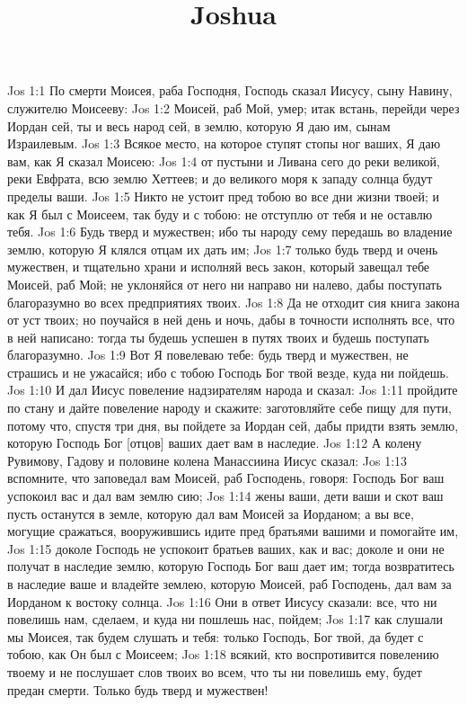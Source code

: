 

\title{Joshua}

Jos 1:1  По смерти Моисея, раба Господня, Господь сказал Иисусу, сыну Навину, служителю Моисееву:
Jos 1:2  Моисей, раб Мой, умер; итак встань, перейди через Иордан сей, ты и весь народ сей, в землю, которую Я даю им, сынам Израилевым.
Jos 1:3  Всякое место, на которое ступят стопы ног ваших, Я даю вам, как Я сказал Моисею:
Jos 1:4  от пустыни и Ливана сего до реки великой, реки Евфрата, всю землю Хеттеев; и до великого моря к западу солнца будут пределы ваши.
Jos 1:5  Никто не устоит пред тобою во все дни жизни твоей; и как Я был с Моисеем, так буду и с тобою: не отступлю от тебя и не оставлю тебя.
Jos 1:6  Будь тверд и мужествен; ибо ты народу сему передашь во владение землю, которую Я клялся отцам их дать им;
Jos 1:7  только будь тверд и очень мужествен, и тщательно храни и исполняй весь закон, который завещал тебе Моисей, раб Мой; не уклоняйся от него ни направо ни налево, дабы поступать благоразумно во всех предприятиях твоих.
Jos 1:8  Да не отходит сия книга закона от уст твоих; но поучайся в ней день и ночь, дабы в точности исполнять все, что в ней написано: тогда ты будешь успешен в путях твоих и будешь поступать благоразумно.
Jos 1:9  Вот Я повелеваю тебе: будь тверд и мужествен, не страшись и не ужасайся; ибо с тобою Господь Бог твой везде, куда ни пойдешь.
Jos 1:10  И дал Иисус повеление надзирателям народа и сказал:
Jos 1:11  пройдите по стану и дайте повеление народу и скажите: заготовляйте себе пищу для пути, потому что, спустя три дня, вы пойдете за Иордан сей, дабы придти взять землю, которую Господь Бог [отцов] ваших дает вам в наследие.
Jos 1:12  А колену Рувимову, Гадову и половине колена Манассиина Иисус сказал:
Jos 1:13  вспомните, что заповедал вам Моисей, раб Господень, говоря: Господь Бог ваш успокоил вас и дал вам землю сию;
Jos 1:14  жены ваши, дети ваши и скот ваш пусть останутся в земле, которую дал вам Моисей за Иорданом; а вы все, могущие сражаться, вооружившись идите пред братьями вашими и помогайте им,
Jos 1:15  доколе Господь не успокоит братьев ваших, как и вас; доколе и они не получат в наследие землю, которую Господь Бог ваш дает им; тогда возвратитесь в наследие ваше и владейте землею, которую Моисей, раб Господень, дал вам за Иорданом к востоку солнца.
Jos 1:16  Они в ответ Иисусу сказали: все, что ни повелишь нам, сделаем, и куда ни пошлешь нас, пойдем;
Jos 1:17  как слушали мы Моисея, так будем слушать и тебя: только Господь, Бог твой, да будет с тобою, как Он был с Моисеем;
Jos 1:18  всякий, кто воспротивится повелению твоему и не послушает слов твоих во всем, что ты ни повелишь ему, будет предан смерти. Только будь тверд и мужествен!
